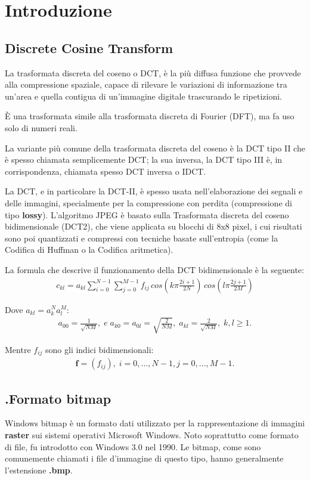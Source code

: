 \documentclass[preprint,12pt]{elsarticle}
\begin{document}
\newpage

\section{Introduzione}
\subsection{Discrete Cosine Transform}
La trasformata discreta del coseno o DCT, è la più diffusa funzione che provvede alla compressione spaziale, capace di rilevare le variazioni di informazione tra un'area e quella contigua di un'immagine digitale trascurando le ripetizioni.

È una trasformata simile alla trasformata discreta di Fourier (DFT), ma fa uso solo di numeri reali.

La variante più comune della trasformata discreta del coseno è la DCT tipo II che è spesso chiamata semplicemente DCT; la sua inversa, la DCT tipo III è, in corrispondenza, chiamata spesso DCT inversa o IDCT. 

La DCT, e in particolare la DCT-II, è spesso usata nell'elaborazione dei segnali e delle immagini, specialmente per la compressione con perdita (compressione di tipo \textbf{lossy}). L'algoritmo JPEG è basato sulla Trasformata discreta del coseno bidimensionale (DCT2), che viene applicata su blocchi di 8x8 pixel, i cui risultati sono poi quantizzati e compressi con tecniche basate sull'entropia (come la Codifica di Huffman o la Codifica aritmetica).

\bigskip
La formula che descrive il funzionamento della DCT bidimensionale è la seguente:
\begin{eqnarray*}
c_{kl} = a_{kl} \sum_{i=0}^{N-1} \sum_{j=0}^{M-1} f_{ij} \,  cos\left(k\pi \frac{2i+1}{2N}\right) \, cos\left(l\pi \frac{2j+1}{2M}\right)
\end{eqnarray*}

Dove $a_{kl} = a_{k}^{N} a_{l}^{M}$:
\begin{eqnarray*}
a_{00} = \frac{1}{\sqrt{NM}},\; e \; a_{k0} = a_{0l} = \sqrt{\frac{2}{NM}},\; a_{kl} = \frac{2}{\sqrt{NM}}, \; k, l \geq 1.
\end{eqnarray*}

Mentre $f_{ij}$ sono gli indici bidimensionali:
\begin{eqnarray*}
\textbf{f} = (f_{ij}), \; i=0, ..., N-1, j=0, ..., M-1.
\end{eqnarray*}

\subsection{.Formato bitmap}
Windows bitmap è un formato dati utilizzato per la rappresentazione di immagini \textbf{raster} sui sistemi operativi Microsoft Windows. Noto soprattutto come formato di file, fu introdotto con Windows 3.0 nel 1990.
Le bitmap, come sono comunemente chiamati i file d'immagine di questo tipo, hanno generalmente l'estensione \textbf{.bmp}.
\end{document}
